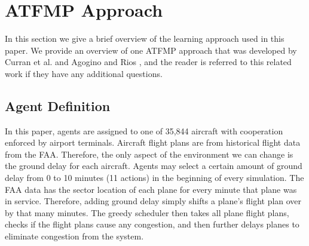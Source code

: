 \documentclass[letterpaper]{article}
\begin{document}

\section{ATFMP Approach}

In this section we give a brief overview of the learning approach used in this paper. We provide an overview of one ATFMP approach that was developed by Curran et al. \cite{Curran:2013:AHC:2484920.2485183} and Agogino and Rios \cite{Agogino:2009:EEM:1570256.1570258,Rios}, and the reader is referred to this related work if they have any additional questions.

\subsection{Agent Definition}
In this paper, agents are assigned to one of 35,844 aircraft with cooperation enforced by airport terminals. Aircraft flight plans are from historical flight data from the FAA. Therefore, the only aspect of the environment we can change is the ground delay for each aircraft. Agents may select a certain amount of ground delay from 0 to 10 minutes (11 actions) in the beginning of every simulation. The FAA data has the sector location of each plane for every minute that plane was in service. Therefore, adding ground delay simply shifts a plane's flight plan over by that many minutes. The greedy scheduler then takes all plane flight plans, checks if the flight plans cause any congestion, and then further delays planes to eliminate congestion from the system.
\end{document}
